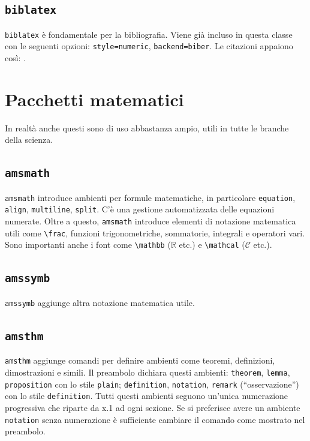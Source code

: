 \documentclass[italian]{tesina-class/tesina}
\theoremstyle{definition}
\theoremstyle{plain}
\begin{document}
\subsection{\texttt{biblatex}}

\verb|biblatex| è fondamentale per la bibliografia.
Viene già incluso in questa classe con le seguenti opzioni: \texttt{style=numeric}, \texttt{backend=biber}.
Le citazioni appaiono così: \autocite{scrivere_una_tesina}.



\section{Pacchetti matematici}

In realtà anche questi sono di uso abbastanza ampio, utili in tutte le branche della scienza.

\subsection{\texttt{amsmath}}

\verb|amsmath| introduce ambienti per formule matematiche, in particolare \verb|equation|, \verb|align|, \verb|multiline|, \verb|split|.
C'è una gestione automatizzata delle equazioni numerate.
Oltre a questo, \verb|amsmath| introduce elementi di notazione matematica utili come \verb|\frac|, funzioni trigonometriche, sommatorie, integrali e operatori vari.
Sono importanti anche i font come \verb|\mathbb| ($\mathbb{R}$ etc.) e \verb|\mathcal| ($\mathcal{C}$ etc.).

\subsection{\texttt{amssymb}}

\verb|amssymb| aggiunge altra notazione matematica utile.

\subsection{\texttt{amsthm}}

\verb|amsthm| aggiunge comandi per definire ambienti come teoremi, definizioni, dimostrazioni e simili.
Il preambolo dichiara questi ambienti: \verb|theorem|, \verb|lemma|, \verb|proposition| con lo stile \verb|plain|; \verb|definition|, \verb|notation|, \verb|remark| (\enquote{osservazione}) con lo stile \verb|definition|.
Tutti questi ambienti seguono un'unica numerazione progressiva che riparte da x.1 ad ogni sezione.
Se si preferisce avere un ambiente \verb|notation| senza numerazione è sufficiente cambiare il comando come mostrato nel preambolo.
\end{document}
